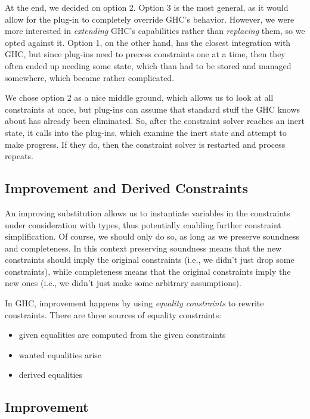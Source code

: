 \documentclass{sigplanconf}
\begin{document}
At the end, we decided on option 2.  Option 3 is the most general, as it
would allow for the plug-in to completely override GHC's behavior.  However,
we were more interested in {\em extending} GHC's capabilities rather than
{\em replacing} them, so we opted against it.  Option 1, on the other hand,
has the closest integration with GHC, but since plug-ins need to precess
constraints one at a time, then they often ended up needing some state,
which than had to be stored and managed somewhere, which became rather
complicated.

We chose option 2 as a nice middle ground, which allows us to look at
all constraints at once, but plug-ins can assume that standard stuff
the GHC knows about has already been eliminated. So, after the constraint
solver reaches an inert state, it calls into the plug-ins, which examine
the inert state and attempt to make progress.  If they do, then the
constraint solver is restarted and process repeats.

\subsection{Improvement and Derived Constraints}
An improving substitution \cite{improvement} allows us to instantiate variables
in the constraints under consideration with types, thus potentially enabling
further constraint simplification.  Of course, we should only do so, as long
as we preserve soundness and completeness.  In this context preserving
soundness means that the new constraints should imply the original
constraints (i.e., we didn't just drop some constraints),
while completeness means that the original constraints imply the new ones
(i.e., we didn't just make some arbitrary assumptions).

In GHC, improvement happens by using {\em equality constraints} to rewrite
constraints.  There are three sources of equality constraints:
\begin{itemize}
\item given equalities are computed from the given constraints
\item wanted equalities arise
\item derived equalities
\end{itemize}







\subsection{Improvement}
\end{document}
